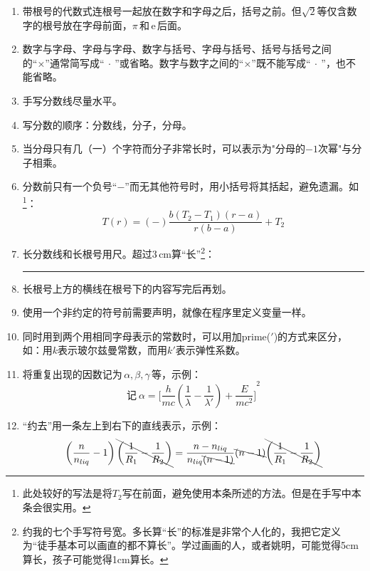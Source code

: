 \documentclass[11pt, a4paper, titlepage]{article}
\begin{document}
\begin{enumerate}
\item 带根号的代数式连根号一起放在数字和字母之后，括号之前。但$\sqrt{2}$等仅含数字的根号放在字母前面，$\pi$\,和\,$\mathrm{e}$\,后面。

\item 数字与字母、字母与字母、数字与括号、字母与括号、括号与括号之间的``×''通常简写成``$\:\cdot\:$''或省略。数字与数字之间的``×''既不能写成``$\:\cdot\:$''，也不能省略。

\item 手写分数线尽量水平。

\item 写分数的顺序：分数线，分子，分母。

\item 当分母只有几（一）个字符而分子非常长时，可以表示为"分母的$-1$次幂"与分子相乘。

\item 分数前只有一个负号``$-$''而无其他符号时，用小括号将其括起，避免遗漏。如\footnote{此处较好的写法是将$T_{2}$写在前面，避免使用本条所述的方法。但是在手写中本条会很实用。}：
    \begin{displaymath}
        T(r) = (-)\frac{b(T_{2}-T_{1})(r-a)}{r(b-a)} + T_{2}
    \end{displaymath}

\item 长分数线和长根号用尺。超过$3\,\mathrm{cm}$算“长”\footnote{约我的七个手写符号宽。多长算“长”的标准是非常个人化的，我把它定义为“徒手基本可以画直的都不算长”。学过画画的人，或者姚明，可能觉得5cm算长，孩子可能觉得1cm算长。}：\rule[2pt]{3cm}{0.6pt}

\item 长根号上方的横线在根号下的内容写完后再划。

\item 使用一个非约定的符号前需要声明，就像在程序里定义变量一样。

\item 同时用到两个用相同字母表示的常数时，可以用加prime($'$)的方式来区分，如：用$k$表示玻尔兹曼常数，而用$k'$表示弹性系数。

\item \label{bracket}将重复出现的因数记为$\,\alpha ,\beta ,\gamma\,$等，示例：
    \begin{displaymath}
        \text{记}\ \alpha = {\biggl[ \frac{h}{mc} \left( \frac{1}{\lambda} - \frac{1}{\lambda'} \right) + \frac{E}{mc^{2}}\biggr]}^{2}
    \end{displaymath}

\item “约去”用一条左上到右下的直线表示，示例：
    \begin{displaymath}
        \left( \frac{n}{n_{liq}} - 1 \right) \bcancel{\left( \frac{1}{R_{1}} - \frac{1}{R_{2}} \right)} =
        \frac{n - n_{liq}}{n_{liq} \bcancel{(n-1)}} \bcancel{(n-1)} \bcancel{\left( \frac{1}{R_{1}} - \frac{1}{R_{2}} \right)}
    \end{displaymath}


\end{enumerate}
\end{document}

